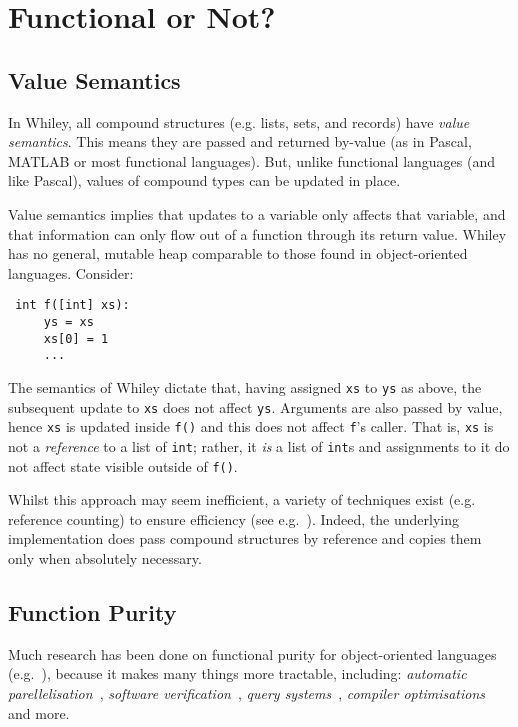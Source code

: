 \section{Functional or Not?}

\subsection{Value Semantics}
\label{value_semantics}
In Whiley, all compound structures (e.g. lists, sets, and records)
have {\em value semantics}.  This means they are passed and returned
by-value (as in Pascal, MATLAB or most functional languages).  But, unlike
functional languages (and like Pascal), values of compound types can
be updated in place.

Value semantics implies that updates to a variable only affects that
variable, and that information can only flow out of a function through
its return value.  Whiley has no general, mutable heap comparable to
those found in object-oriented languages.  Consider:
\begin{lstlisting}
 int f([int] xs):
     ys = xs
     xs[0] = 1
     ...
\end{lstlisting}
The semantics of Whiley dictate that, having assigned \lstinline{xs}
to \lstinline{ys} as above, the subsequent update to \lstinline{xs}
does not affect \lstinline{ys}.  Arguments are also passed by value,
hence \lstinline{xs} is updated inside \lstinline{f()} and this does
not affect \lstinline{f}'s caller.  That is, \lstinline{xs} is not a
{\em reference} to a list of \lstinline{int}; rather, it {\em is} a
list of \lstinline{int}s and assignments to it do not affect state
visible outside of \lstinline{f()}. 

Whilst this approach may seem inefficient, a variety of techniques
exist (e.g. reference counting) to ensure efficiency (see
e.g.~\cite{LH11,Shank01,Ode91}).  Indeed, the underlying
implementation does pass compound structures by reference and copies
them only when absolutely necessary.


\subsection{Function Purity}
Much research has been done on functional purity for object-oriented
languages (e.g.~\cite{Pea11,Rou04,SR05,MRR02}), because it makes 
many things more tractable, including: {\em automatic
 parellelisation}~\cite{ABCR10,CRPAHBW10}, {\em software
 verification}~\cite{Leav02,BNSS04,BA05,DL07}, {\em query
 systems}~\cite{LHS97,WPN08}, {\em compiler
 optimisations}~\cite{Cla97,LLH05,ZRKW08} and more.
